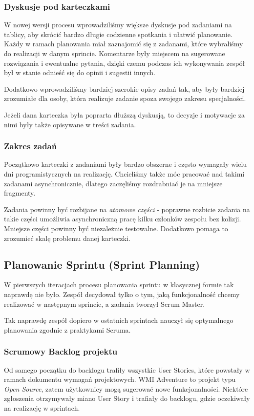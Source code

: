 \documentclass{article}
\begin{document}
\subsubsection*{Dyskusje pod karteczkami}
W nowej wersji procesu wprowadziliśmy większe dyskusje pod zadaniami na tablicy, aby skrócić bardzo długie codzienne spotkania i ułatwić planowanie. Każdy w ramach planowania miał zaznajomić się z zadanami, które wybraliśmy do realizacji w danym sprincie. Komentarze były miejscem na sugerowane rozwiązania i ewentualne pytania, dzięki czemu podczas ich wykonywania zespół był w stanie odnieść się do opinii i sugestii innych.

Dodatkowo wprowadziliśmy bardziej szerokie opisy zadań tak, aby były bardziej zrozumiałe dla osoby, która realizuje zadanie spoza swojego zakresu specjalności.

Jeżeli dana karteczka była poprarta dłuższą dyskusją, to decyzje i motywacje za nimi były także opisywane w treści zadania.

\subsubsection*{Zakres zadań}
Początkowo karteczki z zadaniami były bardzo obszerne i często wymagały wielu dni programistycznych na realizację. Chcieliśmy także móc pracować nad takimi zadanami asynchronicznie, dlatego zaczęliśmy rozdrabniać je na mniejsze fragmenty.

Zadania powinny być rozbijane na \textit{atomowe części} - poprawne rozbicie zadania na takie części umożliwia asynchroniczną pracę kilku członków zespołu bez kolizji. Mniejsze części powinny być niezależnie testowalne. Dodatkowo pomaga to zrozumieć skalę problemu danej karteczki.

\subsection{Planowanie Sprintu (Sprint Planning)}
W pierwszych iteracjach procesu planowania sprintu w klasycznej formie tak naprawdę nie było. Zespół decydował tylko o tym, jaką funkcjonalność chcemy realizować w następnym sprincie, a zadania tworzył Scrum Master.

Tak naprawdę zespół dopiero w ostatnich sprintach nauczył się optymalnego planowania zgodnie z praktykami Scruma.

\subsubsection*{Scrumowy Backlog projektu}
Od samego początku do backlogu trafiły wszystkie User Stories, które powstały w ramach dokumentu wymagań projektowych. WMI Adventure to projekt typu \textit{Open Source}, zatem użytkownicy mogą sugerować nowe funkcjonalności. Niektóre zgłoszenia otrzymywały miano User Story i trafiały do backlogu, gdzie oczekiwały na realizację w sprintach.
\end{document}
